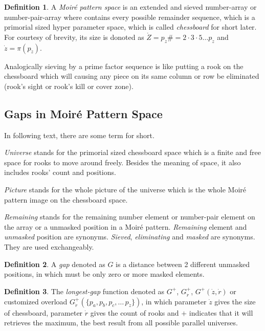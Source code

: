 \documentclass[twocolumn]{article}%
\theoremstyle{definition}
\newtheorem{dfn}{Definition}
\theoremstyle{remark}
\begin{document}
\begin{dfn}
A \emph{Moiré pattern space} is an extended and sieved number-array or number-pair-array where contains every possible remainder sequence, which is a primorial sized hyper parameter space, which is called \emph{chessboard} for short later. For courtesy of brevity, its size is donoted as $\mathring{Z}=p_{\dot{z}}\#=2\cdot3\cdot5\dots p_{\dot{z}}$ and $\dot{z}=\pi(p_{\dot{z}})$.
\end{dfn}

Analogically sieving by a prime factor sequence is like putting a rook on the chessboard which will causing any piece on its same column or row be eliminated (rook's sight or rook's kill or cover zone).

\subsection*{Gaps in Moiré Pattern Space}
In following text, there are some term for short.

\emph{Universe} stands for the primorial sized chessboard space which is a finite and free space for rooks to move around freely. Besides the meaning of space, it also includes rooks' count and positions. %

\emph{Picture} stands for the whole picture of the universe which is the whole Moiré pattern image on the chessboard space.


\emph{Remaining} stands for the remaining number element or number-pair element on the array or a unmasked position in a Moiré pattern. \emph{Remaining} element and \emph{unmasked} position are synonyms. \emph{Sieved}, \emph{eliminating} and \emph{masked} are synonyms. They are used exchangeably.

\begin{dfn}
	A \emph{gap} denoted as $G$ is a distance between 2 different unmasked positions, in which must be only zero or more masked elements.
\end{dfn}
\begin{dfn}
	The \emph{longest-gap} function denoted as $G^{+}$, $G_{\dot{r}}^{+}$, $G^{+}(\dot{z},\dot{r})$ or customized overload $G_{\dot{r}}^{+}(\{p_a,p_b,p_c,\dots\,p_{\dot{z}}\})$, in which parameter $\dot{z}$ gives the size of chessboard, parameter $\dot{r}$ gives the count of rooks and $+$ indicates that it will retrieves the maximum, the best result from all possible parallel universes.
\end{dfn}
\end{document}
